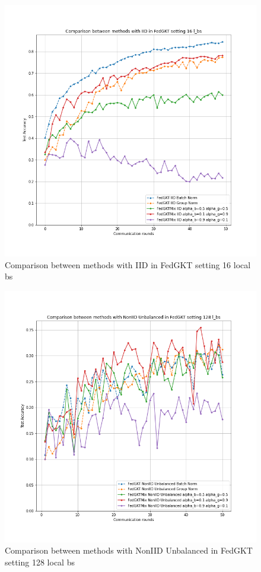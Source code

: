 \documentclass[conference]{IEEEtran}
\begin{document}
\begin{figure}[htb]
    \centering
    \includegraphics[width=\columnwidth]{Images/Comparison between methods with IID in FedGKT setting 16 l_bs.png}
    \caption{Comparison between methods with IID in FedGKT setting 16 local bs}
    \label{fig:appendix5}
\end{figure}
\begin{figure}[htb]
    \centering
    \includegraphics[width=\columnwidth]{Images/Comparison between methods with NonIID Unbalanced in FedGKT setting 128 l_bs.png}
    \caption{Comparison between methods with NonIID Unbalanced in FedGKT setting 128 local bs}
    \label{fig:appendix6}
\end{figure}
\end{document}
